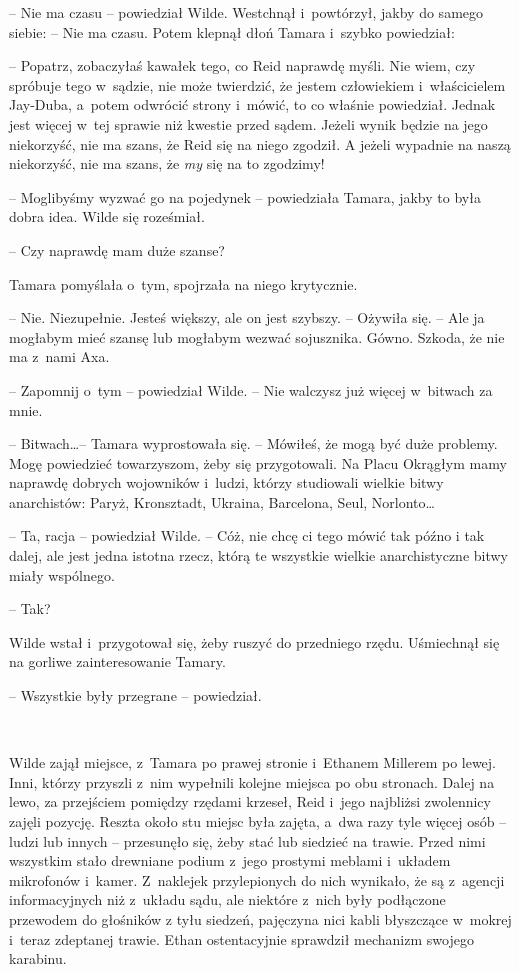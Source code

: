 \documentclass[oneside,polish,11pt,sfheadings]{mwbk}
\begin{document}
-- Nie ma czasu -- powiedział Wilde. Westchnął i~powtórzył, jakby do
samego siebie: -- Nie ma czasu. Potem klepnął dłoń Tamara i~szybko
powiedział: 

-- Popatrz, zobaczyłaś kawałek tego, co Reid naprawdę myśli.
Nie wiem, czy spróbuje tego w~sądzie, nie może twierdzić, że jestem
człowiekiem i~właścicielem Jay-Duba, a~potem odwrócić strony i~mówić, to
co właśnie powiedział. Jednak jest więcej w~tej sprawie niż kwestie
przed sądem. Jeżeli wynik będzie na jego niekorzyść, nie ma szans, że
Reid się na niego zgodził. A jeżeli wypadnie na naszą niekorzyść, nie ma
szans, że \emph{my }się na to zgodzimy!

-- Moglibyśmy wyzwać go na pojedynek -- powiedziała Tamara, jakby to była
dobra idea. Wilde się roześmiał.

-- Czy naprawdę mam duże szanse?

Tamara pomyślała o~tym, spojrzała na niego krytycznie. 

-- Nie. Niezupełnie. Jesteś większy, ale on jest szybszy. -- Ożywiła się. -- Ale
ja mogłabym mieć szansę lub mogłabym wezwać sojusznika. Gówno. Szkoda,
że nie ma z~nami Axa.

-- Zapomnij o~tym -- powiedział Wilde. -- Nie walczysz już więcej w~bitwach
za mnie.

-- Bitwach\ldots -- Tamara wyprostowała się. -- Mówiłeś, że mogą być duże
problemy. Mogę powiedzieć towarzyszom, żeby się przygotowali. Na Placu
Okrągłym mamy naprawdę dobrych wojowników i~ludzi, którzy studiowali
wielkie bitwy anarchistów: Paryż, Kronsztadt, Ukraina, Barcelona, Seul,
Norlonto\ldots

-- Ta, racja -- powiedział Wilde. -- Cóż, nie chcę ci tego mówić tak późno
i tak dalej, ale jest jedna istotna rzecz, którą te wszystkie wielkie
anarchistyczne bitwy miały wspólnego.

-- Tak?

Wilde wstał i~przygotował się, żeby ruszyć do przedniego rzędu.
Uśmiechnął się na gorliwe zainteresowanie Tamary.

-- Wszystkie były przegrane -- powiedział.

~

Wilde zajął miejsce, z~Tamara po prawej stronie i~Ethanem Millerem po
lewej. Inni, którzy przyszli z~nim wypełnili kolejne miejsca po obu
stronach. Dalej na lewo, za przejściem pomiędzy rzędami krzeseł, Reid i~jego najbliżsi zwolennicy zajęli pozycję. Reszta około stu miejsc była
zajęta, a~dwa razy tyle więcej osób -- ludzi lub innych -- przesunęło się,
żeby stać lub siedzieć na trawie. Przed nimi wszystkim stało drewniane
podium z~jego prostymi meblami i~układem mikrofonów i~kamer. Z~naklejek
przylepionych do nich wynikało, że są z~agencji informacyjnych niż z~układu sądu, ale niektóre z~nich były podłączone przewodem do głośników
z tyłu siedzeń, pajęczyna nici kabli błyszczące w~mokrej i~teraz
zdeptanej trawie. Ethan ostentacyjnie sprawdził mechanizm swojego
karabinu.
\end{document}
